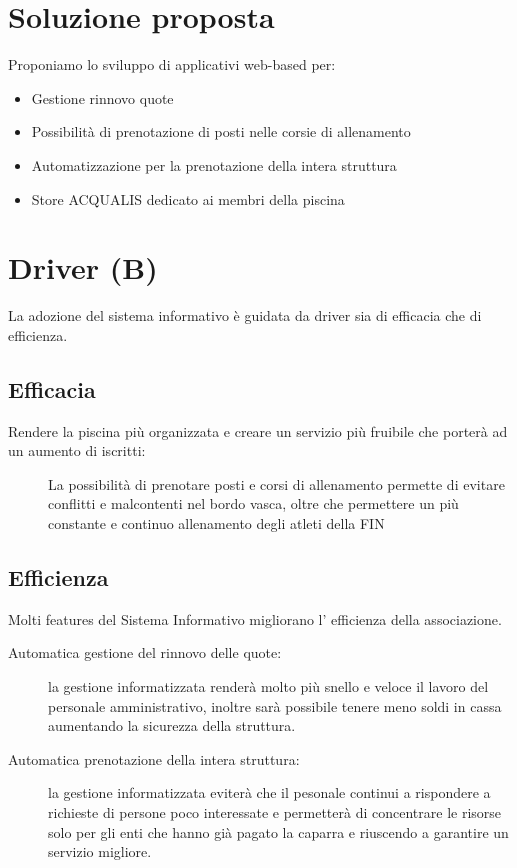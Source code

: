 \documentclass[11pt]{article} %
\begin{document}
\section{Soluzione proposta}

Proponiamo lo sviluppo di applicativi web-based per:

\begin{itemize}
	\item Gestione rinnovo quote
	\item Possibilità di prenotazione di posti nelle corsie di allenamento
	\item Automatizzazione per la prenotazione della intera struttura
	\item Store ACQUALIS dedicato ai membri della piscina
\end{itemize}

\section{Driver (B)}

La adozione del sistema informativo è guidata da driver sia di efficacia che di efficienza.

\subsection{Efficacia}

\begin{description}
	\item[Rendere la piscina più organizzata e creare un servizio più fruibile che porterà ad un aumento di iscritti: ]La possibilità di prenotare posti e corsi di allenamento permette di evitare conflitti e malcontenti nel bordo vasca, oltre che permettere un più constante e continuo allenamento degli atleti della FIN
\end{description}
\subsection{Efficienza}

Molti features del Sistema Informativo migliorano l' efficienza della associazione.

\begin{description}
	\item[Automatica gestione del rinnovo delle quote:] la gestione informatizzata renderà molto più snello e veloce il lavoro del personale amministrativo, inoltre sarà possibile tenere meno soldi in cassa aumentando la sicurezza della struttura. 
	\item[Automatica prenotazione della intera struttura:] la gestione informatizzata eviterà che il pesonale continui a rispondere a richieste di persone poco interessate e permetterà di concentrare le risorse solo per gli enti che hanno già pagato la caparra e riuscendo a garantire un servizio migliore.
\end{description}
\end{document}
